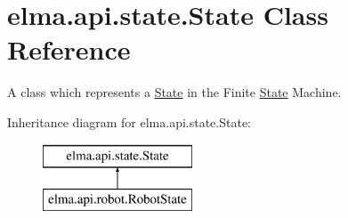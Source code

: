\hypertarget{classelma_1_1api_1_1state_1_1State}{}\section{elma.\+api.\+state.\+State Class Reference}
\label{classelma_1_1api_1_1state_1_1State}


A class which represents a \hyperlink{classelma_1_1api_1_1state_1_1State}{State} in the Finite \hyperlink{classelma_1_1api_1_1state_1_1State}{State} Machine.  


Inheritance diagram for elma.\+api.\+state.\+State\+:\begin{figure}[H]
\begin{center}
\leavevmode
\includegraphics[height=2.000000cm]{classelma_1_1api_1_1state_1_1State}
\end{center}
\end{figure}
